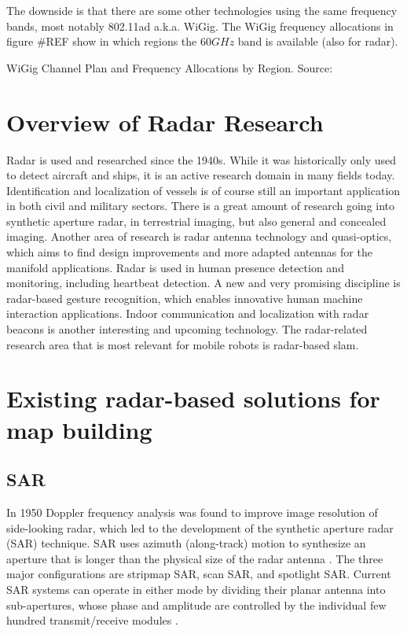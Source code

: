 The downside is that there are some other technologies using the same
frequency bands, most notably 802.11ad a.k.a.
WiGig\cite{AgilentTechnologies2013}. The WiGig frequency allocations in
figure \#REF show in which regions the \(60GHz\) band is available (also
for radar).

%
WiGig Channel Plan and Frequency Allocations by Region. Source:
\cite{AgilentTechnologies2013}

\section{Overview of Radar
Research}\label{overview-of-radar-research}

Radar is used and researched since the 1940s. While it was historically
only used to detect aircraft and ships, it is an active research domain
in many fields today. Identification and localization of vessels is of
course still an important application in both civil and military
sectors. There is a great amount of research going into synthetic
aperture radar, in terrestrial imaging, but also general and concealed
imaging. Another area of research is radar antenna technology and
quasi-optics, which aims to find design improvements and more adapted
antennas for the manifold applications. Radar is used in human presence
detection and monitoring, including heartbeat detection. A new and very
promising discipline is radar-based gesture recognition, which enables
innovative human machine interaction applications. Indoor communication
and localization with radar beacons is another interesting and upcoming
technology. The radar-related research area that is most relevant for
mobile robots is radar-based slam.

\section{Existing radar-based solutions for map
building}\label{existing-radar-based-solutions-for-map-building}

\subsection{SAR}\label{sar}

In 1950 Doppler frequency analysis was found to improve image resolution
of side-looking radar, which led to the development of the synthetic
aperture radar (SAR) technique. SAR uses azimuth (along-track) motion to
synthesize an aperture that is longer than the physical size of the
radar antenna \cite{Wang2008}. The three major configurations are
stripmap SAR, scan SAR, and spotlight SAR. Current SAR systems can
operate in either mode by dividing their planar antenna into
sub-apertures, whose phase and amplitude are controlled by the
individual few hundred transmit/receive modules \cite{Moreira2013}.

